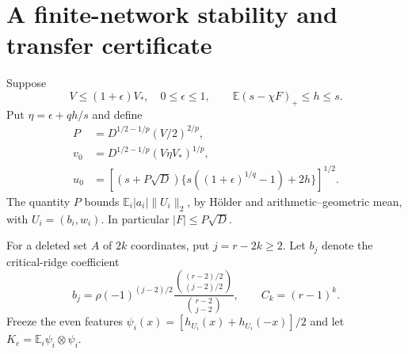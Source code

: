 \documentclass[11pt]{article}
\newcommand{\E}{\mathbb E}\newcommand{\R}{\mathbb R}
\begin{document}
\section{A finite-network stability and transfer certificate}
Suppose
\[
 V\le(1+\epsilon)V_*,\quad 0\le\epsilon\le1,
 \qquad \E(s-\chi F)_+\le h\le s.
 \tag{3}
\]
Put $\eta=\epsilon+q h/s$ and define
\begin{align*}
 P&=D^{1/2-1/p}(V/2)^{2/p},\\
 v_0&=D^{1/2-1/p}(V\eta V_*)^{1/p},\\
 u_0&=\left[(s+P\sqrt D)
            \{s((1+\epsilon)^{1/q}-1)+2h\}\right]^{1/2}.
\end{align*}
The quantity $P$ bounds $\E_i|a_i|\|U_i\|_2$, by H\"older and
arithmetic--geometric mean, with $U_i=(b_i,w_i)$.
In particular $|F|\le P\sqrt D$.

For a deleted set $A$ of $2k$ coordinates, put $j=r-2k\ge2$.
Let $b_j$ denote the critical-ridge coefficient
\[
 b_j=\rho(-1)^{(j-2)/2}
       \frac{\binom{(r-2)/2}{(j-2)/2}}{\binom{r-2}{j-2}},
 \qquad C_k=(r-1)^k.
\]
Freeze the even features
$\psi_i(x)=[h_{U_i}(x)+h_{U_i}(-x)]/2$ and let
$K_e=\E_i\psi_i\otimes\psi_i$.
\end{document}
